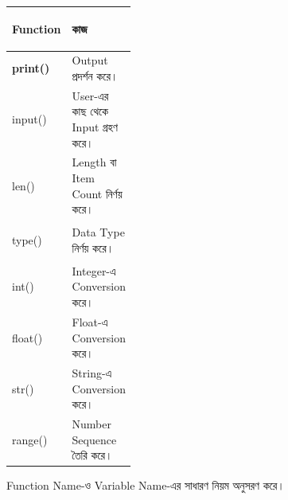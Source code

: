 \begin{tabularx}
{\linewidth}
{
|>{\bfseries\RaggedRight\arraybackslash}p{0.31\linewidth}
|Y|
}

\hline
{}

\textbf{Function}
&
\textbf{কাজ}
\\
\hline

\textenglish{\ttfamily print()}
&
Output প্রদর্শন করে।
\\
\hline

\textenglish{\ttfamily input()}
&
User-এর কাছ থেকে Input গ্রহণ করে।
\\
\hline

\textenglish{\ttfamily len()}
&
Length বা Item Count নির্ণয় করে।
\\
\hline

\textenglish{\ttfamily type()}
&
Data Type নির্ণয় করে।
\\
\hline

\textenglish{\ttfamily int()}
&
Integer-এ Conversion করে।
\\
\hline

\textenglish{\ttfamily float()}
&
Float-এ Conversion করে।
\\
\hline

\textenglish{\ttfamily str()}
&
String-এ Conversion করে।
\\
\hline

\textenglish{\ttfamily range()}
&
Number Sequence তৈরি করে।
\\
\hline

\end{tabularx}



Function Name-ও Variable Name-এর সাধারণ নিয়ম অনুসরণ করে।

